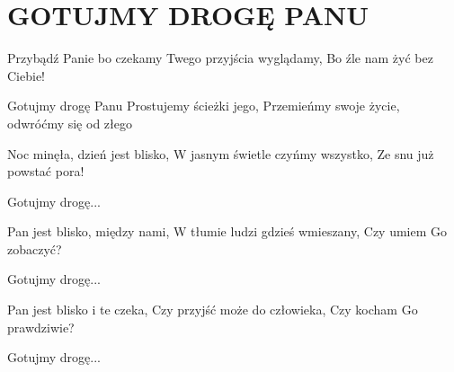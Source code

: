 \documentclass[../../../songbook.tex]{subfiles}
\begin{document}
\TabPositions{8cm} %
\section*{GOTUJMY DROGĘ PANU}
{}
\vspace{0.5cm}
Przybądź Panie bo czekamy		 \newline
Twego przyjścia wyglądamy, 	 \newline
Bo źle nam żyć bez Ciebie!		 \newline
 
\-\hspace{1cm} Gotujmy drogę Panu		 \newline
\-\hspace{1cm} Prostujemy ścieżki jego,	 \newline
\-\hspace{1cm} Przemieńmy swoje życie, 	 \newline
\-\hspace{1cm} odwróćmy się od złego	 \newline
 
Noc minęła, dzień jest blisko, \newline
W jasnym świetle czyńmy wszystko, \newline
Ze snu już powstać pora! \newline
 
\-\hspace{1cm} Gotujmy drogę... \newline
 
Pan jest blisko, między nami, \newline
W tłumie ludzi gdzieś wmieszany, \newline
Czy umiem Go zobaczyć? \newline
 
\-\hspace{1cm} Gotujmy drogę... \newline
 
Pan jest blisko i te czeka, \newline
Czy przyjść może do człowieka, \newline
Czy kocham Go prawdziwie? \newline
 
\-\hspace{1cm} Gotujmy drogę... \newline
\end{document}
